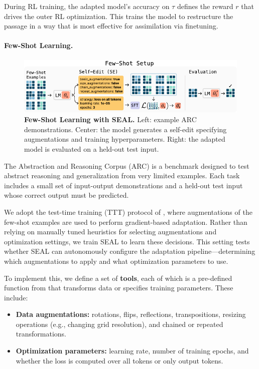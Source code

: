 \documentclass{article}
\newcommand{\methodacronym}{SEAL\xspace}
\begin{document}
During RL training, the adapted model's accuracy on $\tau$ defines the reward $r$ that drives the outer RL optimization. This trains the model to restructure the passage in a way that is most effective for assimilation via finetuning.

\paragraph{Few-Shot Learning.}
\begin{figure}[ht]
\centering
\includegraphics[width=1\linewidth]{figures/few_shot_setup.pdf}
\caption{\textbf{Few-Shot Learning with \methodacronym.} Left: example ARC demonstrations. Center: the model generates a self-edit specifying augmentations and training hyperparameters. Right: the adapted model is evaluated on a held-out test input.}
\label{fig:arc_inner_loop}
\vspace{-4pt}
\end{figure}

The Abstraction and Reasoning Corpus (ARC) \citep{chollet2024arc} is a benchmark designed to test abstract reasoning and generalization from very limited examples. Each task includes a small set of input-output demonstrations and a held-out test input whose correct output must be predicted.

We adopt the test-time training (TTT) protocol of \citet{akyurek2025TTT}, where augmentations of the few-shot examples are used to perform gradient-based adaptation. Rather than relying on manually tuned heuristics for selecting augmentations and optimization settings, we train \methodacronym{} to learn these decisions. This setting tests whether \methodacronym{} can autonomously configure the adaptation pipeline---determining which augmentations to apply and what optimization parameters to use.

To implement this, we define a set of \textbf{tools}, each of which is a pre-defined function from \citet{akyurek2025TTT} that transforms data or specifies training parameters. These include:
\vspace{-4pt}
\begin{itemize}[left=0pt, itemsep=0pt]
    \item \textbf{Data augmentations:} rotations, flips, reflections, transpositions, resizing operations (e.g., changing grid resolution), and chained or repeated transformations.
    \vspace{-2pt}
    \item \textbf{Optimization parameters:} learning rate, number of training epochs, and whether the loss is computed over all tokens or only output tokens.
\end{itemize}
\end{document}
